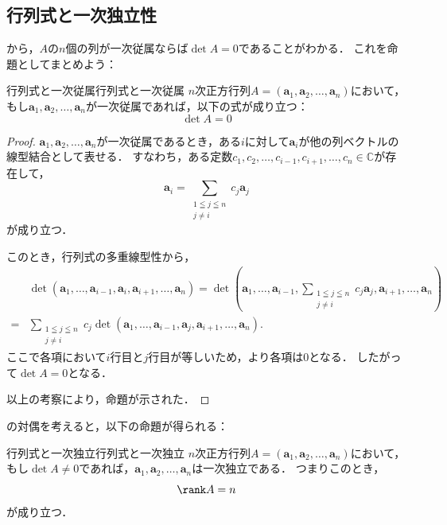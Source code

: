 \subsection{行列式と一次独立性}

から，$A$の$n$個の列が一次従属ならば$\det A =0$であることがわかる．
これを命題としてまとめよう：

\begin{prop}{行列式と一次従属}{行列式と一次従属}
  $n$次正方行列$A = (\bm{a}_1, \bm{a}_2, \dots, \bm{a}_n)$において，もし$\bm{a}_1, \bm{a}_2, \dots, \bm{a}_n$が一次従属であれば，以下の式が成り立つ：
  \[
  \det A = 0
  \]
\end{prop}

\begin{leftbar}
\begin{proof}
  $\bm{a}_1, \bm{a}_2, \dots, \bm{a}_n$が一次従属であるとき，ある$i$に対して$\bm{a}_i$が他の列ベクトルの線型結合として表せる．
  すなわち，ある定数$c_1, c_2, \dots, c_{i-1}, c_{i+1}, \dots, c_n \in \mathbb{C}$が存在して，
  \[
  \bm{a}_i = \sum_{\substack{1\leqq j\leqq n\\ j \ne i}} c_j \bm{a}_j
  \]
  が成り立つ．

  このとき，行列式の多重線型性から，
  \begin{align*} 
    &\det(\bm{a}_1, \dots, \bm{a}_{i-1}, \bm{a}_i, \bm{a}_{i+1}, \dots, \bm{a}_n)  = \det(\bm{a}_1, \dots, \bm{a}_{i-1}, \sum_{\substack{1\leqq j\leqq n\\ j \ne i}} c_j \bm{a}_j, \bm{a}_{i+1}, \dots, \bm{a}_n) \\
    =& \sum_{\substack{1\leqq j\leqq n\\ j\ne i}} c_j \det(\bm{a}_1, \dots, \bm{a}_{i-1}, \bm{a}_j, \bm{a}_{i+1}, \dots, \bm{a}_n).
  \end{align*}
  ここで各項において$i$行目と$j$行目が等しいため，より各項は$0$となる．
  したがって$\det A = 0$となる．
  
  以上の考察により，命題が示された．
\end{proof}
\end{leftbar}

の対偶を考えると，以下の命題が得られる：

\begin{prop}{行列式と一次独立}{行列式と一次独立}
  $n$次正方行列$A = (\bm{a}_1, \bm{a}_2, \dots, \bm{a}_n)$において，もし$\det A \ne 0$であれば，$\bm{a}_1, \bm{a}_2, \dots, \bm{a}_n$は一次独立である．
  つまりこのとき，
  \[
  \rank A = n
  \]
  が成り立つ．
\end{prop}

